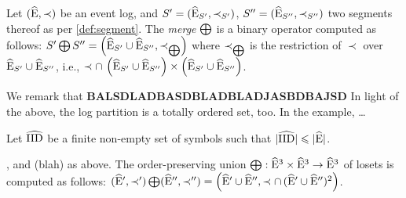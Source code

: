 \begin{newj}
\begin{definition}[Merge]\label{def:merge}
	Let $(\widehat{\mathrm{E}}, \prec)$ be an event log, and
	${S' = (\widehat{\mathrm{E}}_{S'}, \prec_{S'})}$,
	${S'' = (\widehat{\mathrm{E}}_{S''}, \prec_{S''})}$ two segments thereof as per \cref{def:segment}. 
	The \emph{merge} $\bigoplus$ is a binary operator computed as follows: 
	$S' \bigoplus S'' = \left(\widehat{\mathrm{E}}_{S'} \cup \widehat{\mathrm{E}}_{S''}, \prec_{\bigoplus} \right)$ 
	where 
	$\prec_{\bigoplus}$ is the restriction of $\prec$ over $\widehat{\mathrm{E}}_{S'} \cup \widehat{\mathrm{E}}_{S''}$, i.e.,  $\prec \cap\, \left(\widehat{\mathrm{E}}_{S'} \cup \widehat{\mathrm{E}}_{S''}\right) \times \left(\widehat{\mathrm{E}}_{S'} \cup \widehat{\mathrm{E}}_{S''}\right)$. 
\end{definition}
%
We remark that \textbf{BALSDLADBASDBLADBLADJASBDBAJSD}
In light of the above, the log partition is a totally ordered set, too. In the example, \ldots{}

\begin{comment}
def iid(event):
  bla bla bla
  
caseid = iid
hospitalcaseid = iid
treatmentid = iid

comesichiama = {"hospital" : "caseid", "pharma" : "hospitalcaseid", "clinic" : "treatmentid"}

comesichiama["hospital"](x)
\end{comment}

	Let $\widehat{\mathrm{IID}}$ be a finite non-empty set of symbols such that $|\widehat{\mathrm{IID}}| \leqslant |\widehat{\mathrm{E}}|$.

, and (blah) as above. The order-preserving union $\bigoplus: \widehat{\mathrm{E}}^3 \times \widehat{\mathrm{E}}^3 \to \widehat{\mathrm{E}}^3$ of losets is computed as follows: $(\widehat{\mathrm{E}}', \prec') \bigoplus (\widehat{\mathrm{E}}'', \prec'') = \left(\widehat{\mathrm{E}}' \cup \widehat{\mathrm{E}}'', \prec \cap\, (\widehat{\mathrm{E}}'\cup\widehat{\mathrm{E}}'')^2\right)$.


\end{newj}
